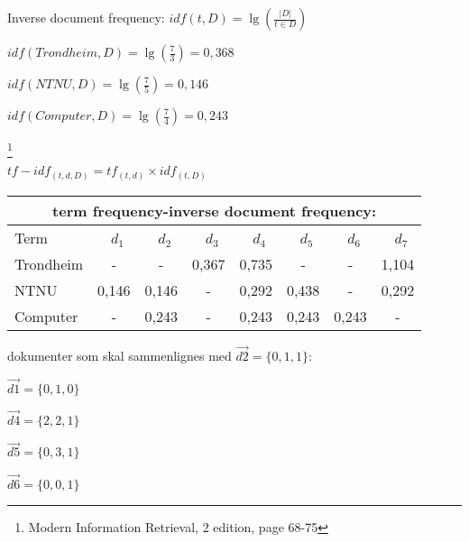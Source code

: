 \documentclass[]{article}
\begin{document}
\begin{center}

Inverse document frequency:
\vspace{5 mm}
$idf(t, D) = \lg(\frac{|D|}{t \in D})$

\vspace{5 mm}

$idf(Trondheim, D) = \lg(\frac{7}{3}) = 0,368$
\vspace{5 mm}

$idf(NTNU, D) = \lg(\frac{7}{5}) = 0,146$
\vspace{5 mm}

$idf(Computer, D) = \lg(\frac{7}{4}) = 0,243$

\end{center}

\let\thefootnote\relax\footnote{Modern Information Retrieval, 2 edition, page 68-75}
\pagebreak


\begin{center}
$tf-idf_{(t,d,D)} = tf_{(t,d)} \times idf_{(t,D)}$
\vspace{5 mm}

\begin{tabular}[t]{|l|ccccccc|}

\multicolumn{8}{c}{term frequency-inverse document frequency:}\\\hline

Term&\ $d_1$&\ $d_2$&\ $d_3$&\ $d_4$&\ $d_5$&\ $d_6$&\ $d_7$\\\hline

Trondheim&-&-&0,367&0,735&-&-&1,104\\


NTNU&0,146&0,146&-&0,292&0,438&-&0,292\\

Computer&-&0,243&-&0,243&0,243&0,243&-\\\hline
\end{tabular}
\end{center}

\vspace{10 mm}
dokumenter som skal sammenlignes med $\overrightarrow{d2} = \{0,1,1\}$:
\vspace{2 mm}

\indent\indent$\overrightarrow{d1} = \{0,1,0\}$

\indent\indent$\overrightarrow{d4} = \{2,2,1\}$

\indent\indent$\overrightarrow{d5} = \{0,3,1\}$

\indent\indent$\overrightarrow{d6} = \{0,0,1\}$
\end{document}
